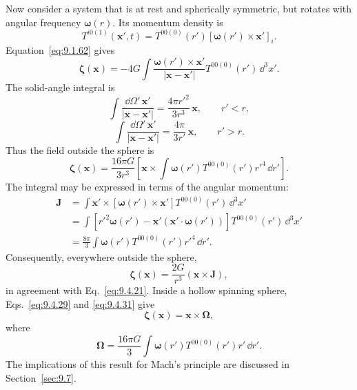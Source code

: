 Now consider a system that is at rest and spherically symmetric, but rotates
with angular frequency \(\boldsymbol\omega(r)\). Its momentum density is
\begin{equation}
  T^{i0(1)}(\mathbf x',t)
  =
  T^{00(0)}(r')
  [\boldsymbol\omega(r')\times\mathbf x']_i.
  \tag{9.4.28}\label{eq:9.4.28}
\end{equation}
Equation~\eqref{eq:9.1.62} gives
\begin{equation}
  \boldsymbol\zeta(\mathbf x)
  =
  -4G\int
  \frac{\boldsymbol\omega(r')\times\mathbf x'}
  {|\mathbf x-\mathbf x'|}
  T^{00(0)}(r')\,\dd^3x'.
  \tag{9.4.29}\label{eq:9.4.29}
\end{equation}
The solid-angle integral is
\begin{equation}
  \int\frac{\dd\Omega'\,\mathbf x'}{|\mathbf x-\mathbf x'|}
  =
  \frac{4\pi r'^2}{3r^3}\,\mathbf x,
  \qquad r'<r,
  \tag{9.4.30}\label{eq:9.4.30}
\end{equation}
\begin{equation}
  \int\frac{\dd\Omega'\,\mathbf x'}{|\mathbf x-\mathbf x'|}
  =
  \frac{4\pi}{3r'}\,\mathbf x,
  \qquad r'>r.
  \tag{9.4.31}\label{eq:9.4.31}
\end{equation}
Thus the field outside the sphere is
\begin{equation}
  \boldsymbol\zeta(\mathbf x)
  =
  \frac{16\pi G}{3r^3}
  \left[
    \mathbf x\times
    \int\boldsymbol\omega(r')T^{00(0)}(r')r'^4\,\dd r'
  \right].
  \tag{9.4.32}\label{eq:9.4.32}
\end{equation}
The integral may be expressed in terms of the angular momentum:
\begin{equation}
  \begin{split}
  \mathbf J
  &=
  \int
  \mathbf x'\times
  [\boldsymbol\omega(r')\times\mathbf x']
  T^{00(0)}(r')\,\dd^3x'\\
  &=
  \int
  \left[
    r'^2\boldsymbol\omega(r')
    -\mathbf x'(\mathbf x'\cdot\boldsymbol\omega(r'))
  \right]T^{00(0)}(r')\,\dd^3x'\\
  &=
  \frac{8\pi}{3}
  \int\boldsymbol\omega(r')T^{00(0)}(r')r'^4\,\dd r'.
  \end{split}
  \tag{9.4.33}\label{eq:9.4.33}
\end{equation}
Consequently, everywhere outside the sphere,
\begin{equation}
  \boldsymbol\zeta(\mathbf x)
  =
  \frac{2G}{r^3}(\mathbf x\times\mathbf J),
  \tag{9.4.34}\label{eq:9.4.34}
\end{equation}
in agreement with Eq.~\eqref{eq:9.4.21}. Inside a hollow spinning sphere,
Eqs.~\eqref{eq:9.4.29} and \eqref{eq:9.4.31} give
\begin{equation}
  \boldsymbol\zeta(\mathbf x)=\mathbf x\times\boldsymbol\Omega,
  \tag{9.4.35}\label{eq:9.4.35}
\end{equation}
where
\begin{equation}
  \boldsymbol\Omega
  =
  \frac{16\pi G}{3}
  \int\boldsymbol\omega(r')T^{00(0)}(r')r'\,\dd r'.
  \tag{9.4.36}\label{eq:9.4.36}
\end{equation}
The implications of this result for Mach's principle are discussed in
Section~\ref{sec:9.7}.
